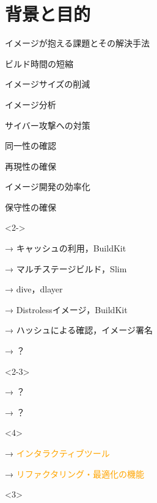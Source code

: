 \section{背景と目的}

\begin{frame}{イメージが抱える課題とその解決手法}
    \begin{multicols}{2}
        \begin{list}{}{\setlength{\itemsep}{1.0zh}}
            \setlength{\itemindent}{-3.0zw}
            \item ビルド時間の短縮
            \item イメージサイズの削減
            \item イメージ分析
            \item サイバー攻撃への対策
            \item 同一性の確認
            \item 再現性の確保
            \item イメージ開発の効率化
            \item 保守性の確保
        \columnbreak
        \setlength{\itemindent}{-4.6zw}
            \begin{onlyenv}<2->
                \item[→] キャッシュの利用，BuildKit
                \item[→] マルチステージビルド，Slim
                \item[→] dive，dlayer
                \item[→] Distrolessイメージ，BuildKit
                \item[→] ハッシュによる確認，イメージ署名
                \item[→] ？
            \end{onlyenv}
            \begin{onlyenv}<2-3>
                \item[→] ？
                \item[→] ？
            \end{onlyenv}
            \begin{onlyenv}<4>
                \item[→] \textcolor{orange}{インタラクティブツール}
                \item[→] \textcolor{orange}{リファクタリング・最適化の機能}
            \end{onlyenv}
        \end{list}
    \end{multicols}

    \begin{onlyenv}<3>
    \end{onlyenv}
\end{frame}